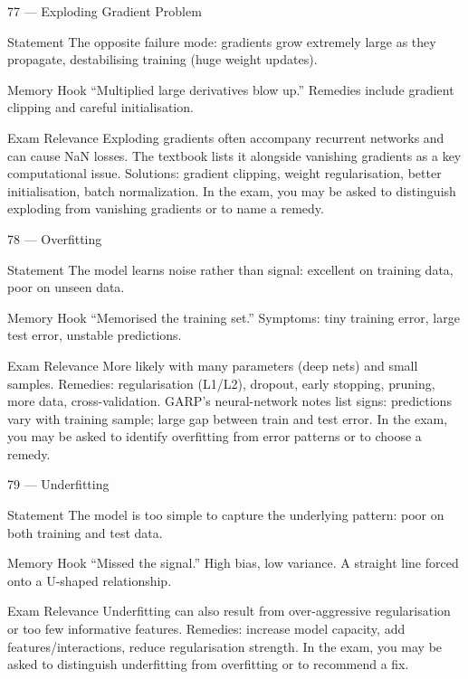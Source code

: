 \documentclass[aspectratio=169,8pt]{beamer}
\begin{document}
	\begin{frame}{77 --- Exploding Gradient Problem}
		\begin{block}{Statement}
			The opposite failure mode: gradients grow extremely large as they propagate, destabilising training (huge weight updates).
		\end{block}
		\begin{block}{Memory Hook}
			``Multiplied large derivatives blow up.'' Remedies include gradient clipping and careful initialisation.
		\end{block}
		\begin{block}{Exam Relevance}
			Exploding gradients often accompany recurrent networks and can cause NaN losses. The textbook lists it alongside vanishing gradients as a key computational issue. Solutions: gradient clipping, weight regularisation, better initialisation, batch normalization. In the exam, you may be asked to distinguish exploding from vanishing gradients or to name a remedy.
		\end{block}
	\end{frame}
	
	\begin{frame}{78 --- Overfitting}
		\begin{block}{Statement}
			The model learns noise rather than signal: excellent on training data, poor on unseen data.
		\end{block}
		\begin{block}{Memory Hook}
			``Memorised the training set.'' Symptoms: tiny training error, large test error, unstable predictions.
		\end{block}
		\begin{block}{Exam Relevance}
			More likely with many parameters (deep nets) and small samples. Remedies: regularisation (L1/L2), dropout, early stopping, pruning, more data, cross-validation. GARP's neural-network notes list signs: predictions vary with training sample; large gap between train and test error. In the exam, you may be asked to identify overfitting from error patterns or to choose a remedy.
		\end{block}
	\end{frame}
	
	\begin{frame}{79 --- Underfitting}
		\begin{block}{Statement}
			The model is too simple to capture the underlying pattern: poor on both training and test data.
		\end{block}
		\begin{block}{Memory Hook}
			``Missed the signal.'' High bias, low variance. A straight line forced onto a U-shaped relationship.
		\end{block}
		\begin{block}{Exam Relevance}
			Underfitting can also result from over-aggressive regularisation or too few informative features. Remedies: increase model capacity, add features/interactions, reduce regularisation strength. In the exam, you may be asked to distinguish underfitting from overfitting or to recommend a fix.
		\end{block}
	\end{frame}
	
\end{document}
